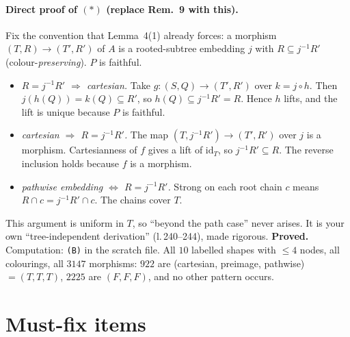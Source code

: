 \documentclass[11pt]{article}
\begin{document}
\paragraph{Direct proof of $(\ast)$ (replace Rem.~9 with this).} Fix the convention that Lemma~4(1)
already forces: a morphism $(T,R)\to(T',R')$ of $A$ is a rooted-subtree embedding $j$ with
$R\subseteq j^{-1}R'$ (colour-\emph{preserving}). $P$ is faithful.
\begin{itemize}[leftmargin=*]
\item \emph{$R=j^{-1}R'$ $\Rightarrow$ cartesian.} Take $g\colon(S,Q)\to(T',R')$ over $k=j\circ h$.
Then $j(h(Q))=k(Q)\subseteq R'$, so $h(Q)\subseteq j^{-1}R'=R$. Hence $h$ lifts, and the lift is
unique because $P$ is faithful.
\item \emph{cartesian $\Rightarrow$ $R=j^{-1}R'$.} The map $(T,j^{-1}R')\to(T',R')$ over $j$ is a
morphism. Cartesianness of $f$ gives a lift of $\mathrm{id}_T$, so $j^{-1}R'\subseteq R$. The
reverse inclusion holds because $f$ is a morphism.
\item \emph{pathwise embedding $\Leftrightarrow$ $R=j^{-1}R'$.} Strong on each root chain $c$ means
$R\cap c=j^{-1}R'\cap c$. The chains cover $T$.
\end{itemize}
This argument is uniform in $T$, so ``beyond the path case'' never arises. It is your own
``tree-independent derivation'' (l.\,240--244), made rigorous. \textbf{Proved.}
Computation: \texttt{(B)} in the scratch file. All $10$ labelled shapes with $\le4$ nodes, all
colourings, all $3147$ morphisms: $922$ are (cartesian, preimage, pathwise) $=(T,T,T)$, $2225$ are
$(F,F,F)$, and no other pattern occurs.

\section{Must-fix items}
\end{document}
